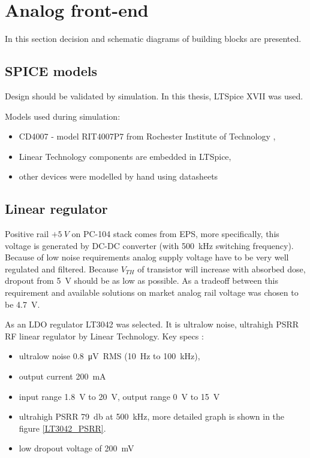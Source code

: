 \section{Analog front-end}
    In this section decision and schematic diagrams of building blocks are presented.

    \subsection{SPICE models}
        Design should be validated by simulation. In this thesis, LTSpice XVII was used.

        Models used during simulation:
        \begin{itemize}
            \item CD4007 - model RIT4007P7 from Rochester Institute of Technology \cite{RIT_FULLER},
            \item Linear Technology components are embedded in LTSpice,
            \item other devices were modelled by hand using datasheets
        \end{itemize}

    \subsection{Linear regulator}
        Positive rail $+\SI{5}{V}$ on PC-104 stack comes from EPS, more specifically, this voltage is generated by DC-DC converter (with \SI{500}{\kilo\hertz} switching frequency). Because of low noise requirements analog supply voltage have to be very well regulated and filtered. Because $V_{TH}$ of transistor will increase with absorbed dose, dropout from \SI{5}{\volt} should be as low as possible. As a tradeoff between this requirement and available solutions on market analog rail voltage was chosen to be \SI{4.7}{\volt}.

        As an LDO regulator LT3042 was selected. It is ultralow noise, ultrahigh PSRR RF linear regulator by Linear Technology. Key specs \cite{LT3042_datasheet}:
        \begin{itemize}
            \item ultralow noise \SI{0.8}{\micro\volt RMS} (\SI{10}{\hertz} to \SI{100}{\kilo\hertz}),
            \item output current \SI{200}{\milli\ampere}
            \item input range \SI{1.8}{\volt} to \SI{20}{\volt}, output range \SI{0}{\volt} to \SI{15}{\volt}
            \item ultrahigh PSRR \SI{79}{\decibel} at \SI{500}{\kilo\hertz}, more detailed graph is shown in the figure \ref{LT3042_PSRR}.
            \item low dropout voltage of \SI{200}{\mV}
        \end{itemize}

